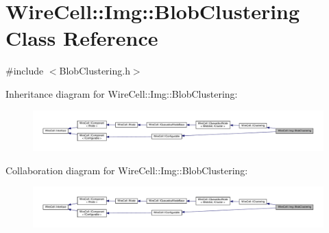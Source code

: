\hypertarget{class_wire_cell_1_1_img_1_1_blob_clustering}{}\section{Wire\+Cell\+:\+:Img\+:\+:Blob\+Clustering Class Reference}
\label{class_wire_cell_1_1_img_1_1_blob_clustering}


{\ttfamily \#include $<$Blob\+Clustering.\+h$>$}



Inheritance diagram for Wire\+Cell\+:\+:Img\+:\+:Blob\+Clustering\+:
\nopagebreak
\begin{figure}[H]
\begin{center}
\leavevmode
\includegraphics[width=350pt]{class_wire_cell_1_1_img_1_1_blob_clustering__inherit__graph}
\end{center}
\end{figure}


Collaboration diagram for Wire\+Cell\+:\+:Img\+:\+:Blob\+Clustering\+:
\nopagebreak
\begin{figure}[H]
\begin{center}
\leavevmode
\includegraphics[width=350pt]{class_wire_cell_1_1_img_1_1_blob_clustering__coll__graph}
\end{center}
\end{figure}
